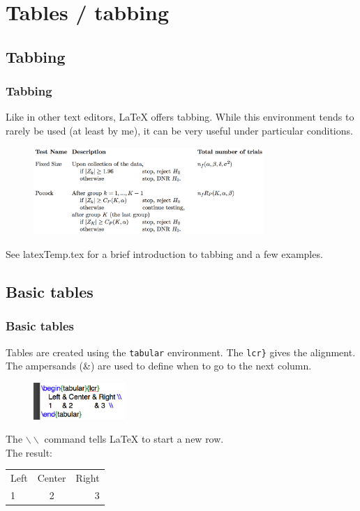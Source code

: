 \documentclass[slidestop,compress,mathserif]{beamer}
\begin{document}
\section[Tables / tabbing]{Tables / tabbing}

\subsection[Tabbing]{Tabbing}
\begin{frame} \frametitle{Tabbing}
Like in other text editors, LaTeX offers tabbing. While this environment tends to rarely be used (at least by me), it can be very useful under particular conditions.
\begin{figure}[htbp]
   \centering
   \includegraphics[height=1.3in]{basicsOfLatex/tabTable/tabbingExample}
\end{figure}
See {\color{highlight}latexTemp.tex} for a brief introduction to tabbing and a few examples.
\end{frame}

\subsection[Basic tables]{Basic tables}
\begin{frame} \frametitle{Basic tables}
Tables are created using the \texttt{\color{highlight}tabular} environment. The \text{\color{braces}\{}\texttt{lcr}\texttt{\color{braces}\}} gives the alignment. The ampersands ({\color{highlight}\&}) are used to define when to go to the next column.
\begin{figure}[htbp]
   \centering
   \includegraphics[height=0.55in]{basicsOfLatex/tabTable/basicTable}
\end{figure}
The \texttt{\color{command}$\backslash\backslash$} command tells LaTeX to start a new row.  \\
\vspace{0.3cm}
The result: \\
\vspace{0.3cm}
\begin{tabular}{lcr} %
	Left & Center & Right \\ %
	1     & 2           & 3  \\
\end{tabular}
\end{frame}
\end{document}
